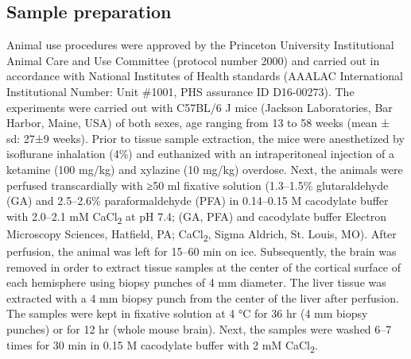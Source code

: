 \documentclass{article}
\begin{document}
\subsection*{Sample preparation}
Animal use procedures were approved by the Princeton University Institutional Animal Care and Use Committee (protocol number 2000) and carried out in accordance with National Institutes of Health standards (AAALAC International Institutional Number: Unit \#1001, PHS assurance ID D16-00273). The experiments were carried out with C57BL/6 J mice (Jackson Laboratories, Bar Harbor, Maine, USA) of both sexes, age ranging from 13 to 58 weeks (mean ± sd: 27±9 weeks). Prior to tissue sample extraction, the mice were anesthetized by isoflurane inhalation (4\%) and euthanized with an intraperitoneal injection of a ketamine (100 mg/kg) and xylazine (10 mg/kg) overdose. Next, the animals were perfused transcardially with ≥50 ml fixative solution (1.3–1.5\% glutaraldehyde (GA) and 2.5–2.6\% paraformaldehyde (PFA) in 0.14–0.15 M cacodylate buffer with 2.0–2.1 mM CaCl\textsubscript{2} at pH 7.4; (GA, PFA) and cacodylate buffer Electron Microscopy Sciences, Hatfield, PA; CaCl\textsubscript{2}, Sigma Aldrich, St. Louis, MO). After perfusion, the animal was left for 15–60 min on ice. Subsequently, the brain was removed in order to extract tissue samples at the center of the cortical surface of each hemisphere using biopsy punches of 4 mm diameter. The liver tissue was extracted with a 4 mm biopsy punch from the center of the liver after perfusion. The samples were kept in fixative solution at 4 °C for 36 hr (4 mm biopsy punches) or for 12 hr (whole mouse brain). Next, the samples were washed 6–7 times for 30 min in 0.15 M cacodylate buffer with 2 mM CaCl\textsubscript{2}.
\end{document}
